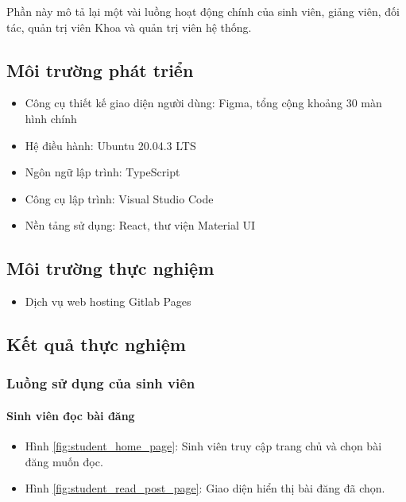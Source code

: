 \documentclass[./../main.tex]{subfiles}
\begin{document}
Phần này mô tả lại một vài luồng hoạt động chính của sinh viên, giảng viên, đối tác, quản trị viên Khoa và quản trị viên hệ thống.

\subsection{Môi trường phát triển}

\begin{itemize}
	\item Công cụ thiết kế giao diện người dùng: Figma, tổng cộng khoảng 30 màn hình chính
	\item Hệ điều hành: Ubuntu 20.04.3 LTS
	\item Ngôn ngữ lập trình: TypeScript
	\item Công cụ lập trình: Visual Studio Code
	\item Nền tảng sử dụng: React, thư viện Material UI
\end{itemize}

\subsection{Môi trường thực nghiệm}

\begin{itemize}
	\item Dịch vụ web hosting Gitlab Pages
\end{itemize}

\subsection{Kết quả thực nghiệm}

\subsubsection{Luồng sử dụng của sinh viên}

\paragraph*{Sinh viên đọc bài đăng}

\begin{itemize}
	\item Hình \ref{fig:student_home_page}: Sinh viên truy cập trang chủ và chọn bài đăng muốn đọc.
	\item Hình \ref{fig:student_read_post_page}: Giao diện hiển thị bài đăng đã chọn.
\end{itemize}
\end{document}

